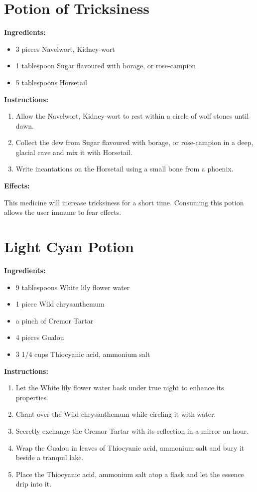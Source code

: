 \documentclass{article}
\begin{document}
\newpage
\section*{Potion of Tricksiness}

\textbf{Ingredients:}

\begin{itemize}
  \item 3 pieces Navelwort, Kidney-wort
  \item 1 tablespoon Sugar flavoured with borage, or rose-campion
  \item 5 tablespoons Horsetail
\end{itemize}

\textbf{Instructions:}

\begin{enumerate}
  \item Allow the Navelwort, Kidney-wort to rest within a circle of wolf stones until dawn.
  \item Collect the dew from Sugar flavoured with borage, or rose-campion in a deep, glacial cave and mix it with Horsetail.
  \item Write incantations on the Horsetail using a small bone from a phoenix.
\end{enumerate}

\textbf{Effects:}

This medicine will increase tricksiness for a short time. Consuming this potion allows the user immune to fear effects.

\newpage
\section*{Light Cyan Potion}

\textbf{Ingredients:}

\begin{itemize}
  \item 9 tablespoons White lily flower water
  \item 1 piece Wild chrysanthemum
  \item a pinch of Cremor Tartar
  \item 4 pieces Gualou
  \item 3 1/4 cups Thiocyanic acid, ammonium salt
\end{itemize}

\textbf{Instructions:}

\begin{enumerate}
  \item Let the White lily flower water bask under true night to enhance its properties.
  \item Chant over the Wild chrysanthemum while circling it with water.
  \item Secretly exchange the Cremor Tartar with its reflection in a mirror an hour.
  \item Wrap the Gualou in leaves of Thiocyanic acid, ammonium salt and bury it beside a tranquil lake.
  \item Place the Thiocyanic acid, ammonium salt atop a flask and let the essence drip into it.
\end{enumerate}
\end{document}
